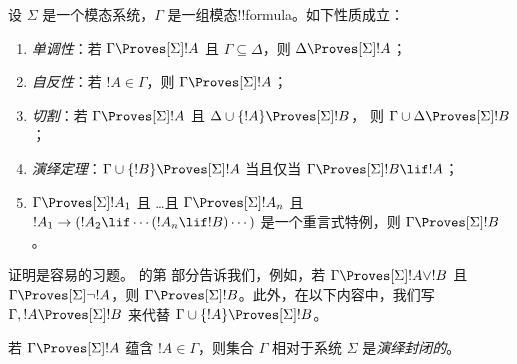 \documentclass[../../../include/open-logic-section]{subfiles}
\begin{document}


\begin{prop}
  设 $\Sigma$ 是一个模态系统，$\Gamma$ 是一组模态!!{formula}。如下性质成立：
  \begin{enumerate}
  \item{} \emph{单调性}：若
    $\Gamma \Proves[\Sigma] !A$ 且 $\Gamma \subseteq \Delta$，则
    $\Delta \Proves[\Sigma] !A$；
  \item{}
    \emph{自反性}：若 $!A \in \Gamma$，则 $\Gamma
    \Proves[\Sigma] !A$；
  \item{} \emph{切割}：若 $\Gamma
    \Proves[\Sigma] !A$ 且 $\Delta \cup \{!A\} \Proves[\Sigma] !B$，
    则 $\Gamma \cup \Delta \Proves[\Sigma] !B$；
  \item{} \emph{演绎定理}：$\Gamma \cup \{!B\}
    \Proves[\Sigma] !A$ 当且仅当 $\Gamma \Proves[\Sigma] !B \lif
      !A$；
  \item {}%
    $\Gamma \Proves[\Sigma] !A_1$ 且 \dots 且 $\Gamma
    \Proves[\Sigma] !A_n$ 且 $!A_1 \to (!A_2 \lif \cdots (!A_n \lif
    !B)\cdots)$ 是一个重言式特例，则 $\Gamma
    \Proves[\Sigma] !B$。
  \end{enumerate}
\end{prop}

证明是容易的习题。 的第
 部分告诉我们，例如，若 $\Gamma \Proves[\Sigma] !A \lor !B$
且 $\Gamma \Proves[\Sigma] \lnot !A$，则 $\Gamma \Proves[\Sigma]
!B$。此外，在以下内容中，我们写 $\Gamma, !A \Proves[\Sigma] !B$
来代替 $\Gamma \cup \{ !A\} \Proves[\Sigma] !B$。

\begin{defn}
  若 $\Gamma \Proves[\Sigma] !A$ 蕴含 $!A \in \Gamma$，则集合
  $\Gamma$ 相对于系统 $\Sigma$ 是\emph{演绎封闭的}。
\end{defn}
\end{document}
